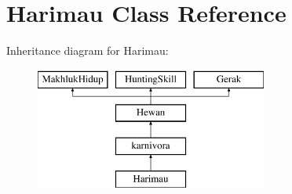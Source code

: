 \hypertarget{class_harimau}{}\section{Harimau Class Reference}
\label{class_harimau}
Inheritance diagram for Harimau\+:\begin{figure}[H]
\begin{center}
\leavevmode
\includegraphics[height=4.000000cm]{class_harimau}
\end{center}
\end{figure}
